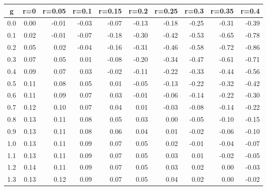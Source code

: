 %
\begin{table}[!tbp]
 \begin{center}
 \begin{tabular}{rrrrrrrrrr}\hline\hline
\multicolumn{1}{c}{g}&\multicolumn{1}{c}{r=0}&\multicolumn{1}{c}{r=0.05}&\multicolumn{1}{c}{r=0.1}&\multicolumn{1}{c}{r=0.15}&\multicolumn{1}{c}{r=0.2}&\multicolumn{1}{c}{r=0.25}&\multicolumn{1}{c}{r=0.3}&\multicolumn{1}{c}{r=0.35}&\multicolumn{1}{c}{r=0.4}\tabularnewline
\hline
0.0&0.00&-0.01&-0.03&-0.07&-0.13&-0.18&-0.25&-0.31&-0.39\tabularnewline
0.1&0.02&-0.01&-0.07&-0.18&-0.30&-0.42&-0.53&-0.65&-0.78\tabularnewline
0.2&0.05& 0.02&-0.04&-0.16&-0.31&-0.46&-0.58&-0.72&-0.86\tabularnewline
0.3&0.07& 0.05& 0.01&-0.08&-0.20&-0.34&-0.47&-0.61&-0.71\tabularnewline
0.4&0.09& 0.07& 0.03&-0.02&-0.11&-0.22&-0.33&-0.44&-0.56\tabularnewline
0.5&0.11& 0.08& 0.05& 0.01&-0.05&-0.13&-0.22&-0.32&-0.42\tabularnewline
0.6&0.11& 0.09& 0.07& 0.03&-0.01&-0.06&-0.14&-0.22&-0.30\tabularnewline
0.7&0.12& 0.10& 0.07& 0.04& 0.01&-0.03&-0.08&-0.14&-0.22\tabularnewline
0.8&0.13& 0.11& 0.08& 0.05& 0.03& 0.00&-0.05&-0.10&-0.15\tabularnewline
0.9&0.13& 0.11& 0.08& 0.06& 0.04& 0.01&-0.02&-0.06&-0.10\tabularnewline
1.0&0.13& 0.11& 0.09& 0.07& 0.05& 0.02&-0.01&-0.04&-0.07\tabularnewline
1.1&0.13& 0.11& 0.09& 0.07& 0.05& 0.03& 0.01&-0.02&-0.05\tabularnewline
1.2&0.14& 0.11& 0.09& 0.07& 0.05& 0.03& 0.02& 0.00&-0.03\tabularnewline
1.3&0.13& 0.12& 0.09& 0.07& 0.05& 0.04& 0.02& 0.00&-0.02\tabularnewline
\hline
\end{tabular}

\end{center}

\end{table}

